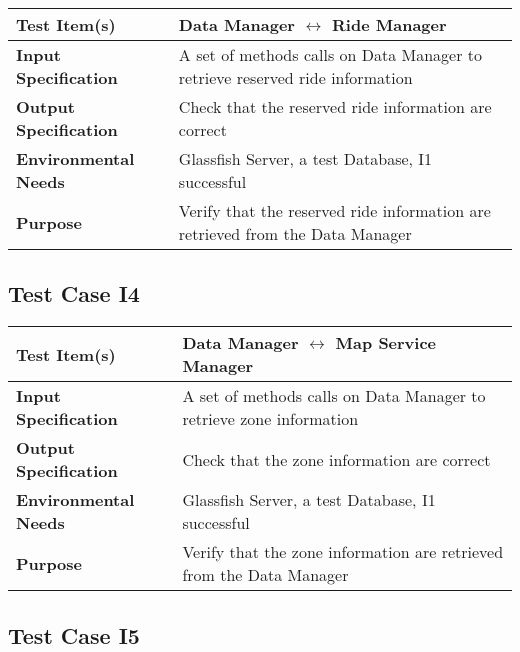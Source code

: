      	\begin{tabular}{p{} p{}}
     		\hline
     		\textbf{Test Item(s)} & Data Manager $ \longleftrightarrow $  Ride Manager \\
     		\hline
     		\textbf{Input Specification} & A set of methods calls on Data Manager to retrieve reserved ride information\\
     		\hline
     		\textbf{Output Specification} & Check that the reserved ride information are correct\\
     		\hline
     		\textbf{Environmental Needs} &  Glassfish Server, a test Database, I1 successful\\
     		\hline
     		\textbf{Purpose} & Verify that the reserved ride information are retrieved from the Data Manager \\
     		\hline
     	\end{tabular}
     
     
      \subsection{Test Case I4}
      
      	\begin{tabular}{p{} p{}}
      		\hline
      		\textbf{Test Item(s)} & Data Manager $ \longleftrightarrow $ Map Service Manager  \\
      		\hline
      		\textbf{Input Specification} & A set of methods calls on Data Manager to retrieve zone information \\
      		\hline
      		\textbf{Output Specification} & Check that the zone information are correct\\
      		\hline
      		\textbf{Environmental Needs} &  Glassfish Server, a test Database, I1 successful\\
      		\hline
      		\textbf{Purpose} & Verify that the zone information are retrieved from the Data Manager \\
      		\hline
      	\end{tabular}
      
      
       \subsection{Test Case I5}
       
